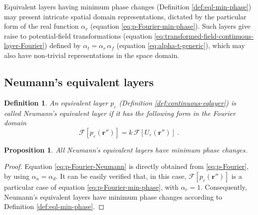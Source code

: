 \documentclass[manuscript,noblind]{geophysics}
\newtheorem{proposition}{Proposition}
\newtheorem{definition}{Definition}
\begin{document}
	Equivalent layers having minimum phase changes (Definition \ref{def:eql-min-phase}) may present intricate 
	spatial domain representations, dictated by the particular form of the real function $\alpha_{r}$
	(equation \ref{eq:p-Fourier-min-phase}).
	Such layers give raise to potential-field transformations (equation \ref{eq:transformed-field-continuous-layer-Fourier})
	defined by $\alpha_{t} = \alpha_{r} \, \alpha_{f}$ (equation \ref{eq:alpha-t-generic}), which may also
	have non-trivial representations in the space domain.
	
	\subsection{Neumann's equivalent layers}
	
	\begin{definition}
		An equivalent layer $p_{\varepsilon}$ (Definition \ref{def:continuous-eqlayer}) is called Neumann's equivalent 
		layer if it has the following form in the Fourier domain
		\begin{equation}
			\mathcal{F} [ p_{\varepsilon}(\mathbf{r}'') ] =
			k \, \mathcal{F} [ U_{\varepsilon}(\mathbf{r}'') ] \: .
			\label{eq:p-Fourier-Neumann}
		\end{equation}
		\label{def:eql-Neumann}
	\end{definition}
	\begin{proposition}
		All Neumann's equivalent layers have minimum phase changes.
		\label{prop:eql-Neumann}
	\end{proposition}
	\begin{proof}
		Equation \ref{eq:p-Fourier-Neumann} is directly obtained from \ref{eq:p-Fourier}, by using 
		$\alpha_{a} = \alpha_{d}$. It can be easily verified that, in this case, 
		$\mathcal{F} [ p_{\varepsilon}(\mathbf{r}'') ]$ is a particular case of equation \ref{eq:p-Fourier-min-phase},
		with $\alpha_{r} = 1$. Consequently, Neumann's equivalent layers have minimum phase changes
		according to Definition \ref{def:eql-min-phase}.
	\end{proof}
	
\end{document}
